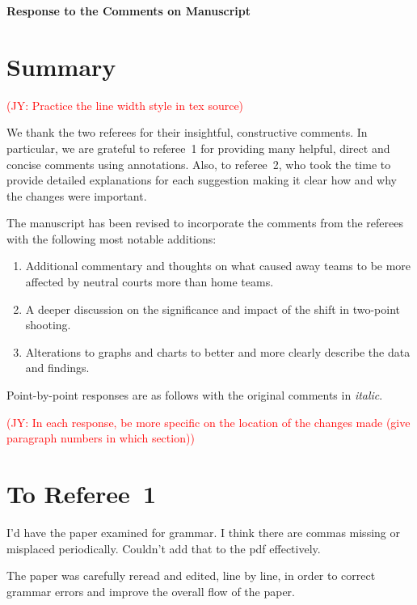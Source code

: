 \documentclass[12pt]{article}
\newcommand{\jy}[1]{\textcolor{red}{(JY: #1)}}
\newenvironment{comment}%
{\begin{quoting}\noindent\small\it\ignorespaces%
  }{\end{quoting}}
\begin{document}
\begin{center}
  {\Large\bf Response to the Comments on Manuscript}
\end{center}

\section*{Summary}
\jy{Practice the line width style in tex source}

We thank the two referees for their insightful, constructive
comments. In particular, we are grateful to referee~1 for providing
many helpful, direct and concise comments using annotations. Also, to
referee~2, who took the time to provide detailed explanations for each
suggestion making it clear how and why the changes were important.

The manuscript has been revised to incorporate the comments from the
referees with the following most notable additions:

\begin{enumerate}
\item
  Additional commentary and thoughts on what caused away teams to be more affected by neutral courts more than home teams.
  \item
  A deeper discussion on the significance and impact of the shift in two-point shooting.
\item
  Alterations to graphs and charts to better and more clearly describe the data and findings.
\end{enumerate}

Point-by-point responses are as follows with the original comments in \emph{italic}.

\jy{In each response, be more specific on the location of the changes made (give
  paragraph numbers in which section)}

\section*{To Referee~1}

\begin{comment}
  I’d have the paper examined for grammar.  I think there are commas missing or misplaced periodically. Couldn’t add that to the pdf effectively.
\end{comment}

 The paper was carefully reread and edited, line by line, in order to correct grammar errors and improve the overall flow of the paper.
 
\end{document}
